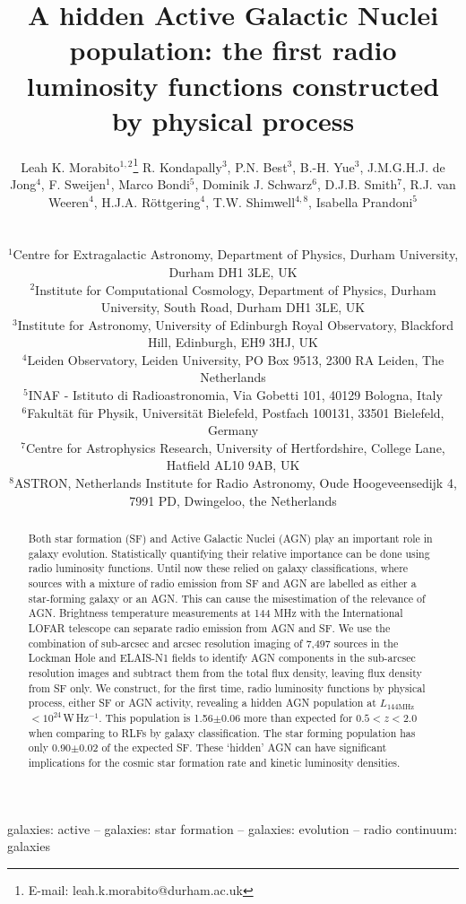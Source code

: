 \documentclass[usenatbib,fleqn,letters]{mnras}
\title[A hidden AGN population]{A hidden Active Galactic Nuclei population: the first radio luminosity functions constructed by physical process}
\author[L.K. Morabito]{\parbox{\textwidth}{Leah K. Morabito$^{1,2}$\thanks{E-mail: leah.k.morabito@durham.ac.uk}\orcidlink{0000-0003-0487-6651}
R. Kondapally$^{3}$\orcidlink{0000-0001-6127-8151},
P.N. Best$^{3}$\orcidlink{0000-0001-5081-4801},
B.-H. Yue$^{3}$\orcidlink{0009-0009-8935-2929}, 
J.M.G.H.J. de Jong$^{4}$\orcidlink{0000-0001-6876-8719},
F. Sweijen$^{1}$\orcidlink{0000-0002-6470-7967},
Marco Bondi$^{5}$\orcidlink{0000-0002-9553-7999},
Dominik J. Schwarz$^{6}$\orcidlink{0000-0003-2413-0881},
D.J.B. Smith$^{7}$\orcidlink{0000-0001-9708-253X},
R.J. van Weeren$^{4}$\orcidlink{0000-0002-0587-1660},
H.J.A. R\"{o}ttgering$^{4}$\orcidlink{0000-0001-8887-2257},
T.W. Shimwell$^{4,8}$\orcidlink{0000-0001-5648-9069},
Isabella Prandoni$^{5}$\orcidlink{0000-0001-9680-7092}
\\}\\ 
$^{1}$Centre for Extragalactic Astronomy, Department of Physics, Durham University, Durham DH1 3LE, UK \\
$^{2}$Institute for Computational Cosmology, Department of Physics, Durham University, South Road, Durham DH1 3LE, UK \\ 
$^{3}$Institute for Astronomy, University of Edinburgh Royal Observatory, Blackford Hill, Edinburgh, EH9 3HJ, UK \\
$^{4}$Leiden Observatory, Leiden University, PO Box 9513, 2300 RA Leiden, The Netherlands \\
$^{5}$INAF - Istituto di Radioastronomia, Via Gobetti 101, 40129 Bologna, Italy  \\
$^{6}$Fakult\"{a}t f\"{u}r Physik, Universit\"{a}t Bielefeld, Postfach 100131, 33501 Bielefeld, Germany \\
$^{7}$Centre for Astrophysics Research, University of Hertfordshire, College Lane, Hatfield AL10 9AB, UK \\
$^{8}$ASTRON, Netherlands Institute for Radio Astronomy, Oude Hoogeveensedijk 4, 7991 PD, Dwingeloo, the Netherlands \\}
\newcommand{\wphz}{$\,$W$\,$Hz$^{-1}$}
\newcommand{\llof}{$L_{\textrm{144MHz}}$}
\begin{document}
\date{}
\pagerange{\pageref{firstpage}--\pageref{lastpage}} 
\maketitle

\label{firstpage}

\begin{abstract}
Both star formation (SF) and Active Galactic Nuclei (AGN) play an important role in galaxy evolution. Statistically quantifying their relative importance can be done using radio luminosity functions. Until now these relied on galaxy classifications, where sources with a mixture of radio emission from SF and AGN are labelled as either a star-forming galaxy or an AGN. This can cause the misestimation of the relevance of AGN. Brightness temperature measurements at 144 MHz with the International LOFAR telescope can separate radio emission from AGN and SF. We use the combination of sub-arcsec and arcsec resolution imaging of 7,497 sources in the Lockman Hole and ELAIS-N1 fields to identify AGN components in the sub-arcsec resolution images and subtract them from the total flux density, leaving flux density from SF only. We construct, for the first time, radio luminosity functions by physical process, either SF or AGN activity, revealing a hidden AGN population at \llof$<10^{24}$\wphz . This population is 1.56$\pm$0.06 more than expected for $0.5<z<2.0$ when comparing to RLFs by galaxy classification. The star forming population has only 0.90$\pm$0.02 of the expected SF. These ‘hidden’ AGN can have significant implications for the cosmic star formation rate and kinetic luminosity densities.
\end{abstract}

\begin{keywords}
galaxies: active -- galaxies: star formation -- galaxies: evolution -- radio continuum: galaxies 
\vspace{3.7in}
\end{keywords}
\end{document}
